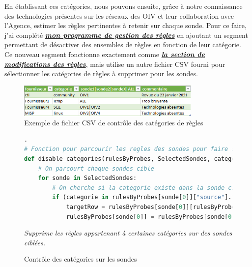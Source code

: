 En établissant ces catégories, nous pouvons ensuite, grâce à notre connaissance des technologies présentes sur les réseaux des OIV et leur collaboration avec l'Agence, estimer les règles pertinentes à retenir sur chaque sonde. Pour ce faire, j'ai complété \hyperref[chap3:section1]{\textbf{\textit{mon programme de gestion des règles}}} en ajoutant un segment permettant de désactiver des ensembles de règles en fonction de leur catégorie.\\

Ce nouveau segment fonctionne exactement comme \hyperref[chap3:section1rulesmodif]{\textbf{\textit{la section de modifications des règles}}}, mais utilise un autre fichier CSV fourni pour sélectionner les catégories de règles à supprimer pour les sondes.\\

\vspace{1em}

\begin{figure}[h]%
    \center%
    \includegraphics[width=0.8\textwidth]{assets/CategoriDisable.png}
    \caption[Exemple de fichier CSV de contrôle des catégories de règles]{Exemple de fichier CSV de contrôle des catégories de règles}\label{fig:CategoriDisable}
\end{figure}

\vspace{0.5em}

\begin{figure}[h]%
    \center%
\begin{lstlisting}[language=Python].
# Fonction pour parcourir les regles des sondes pour faire si possible la modification
def disable_categories(rulesByProbes, SelectedSondes, categorie, toDisable, modification_error):
    # On parcourt chaque sondes cible
    for sonde in SelectedSondes:
        # On cherche si la categorie existe dans la sonde cible
        if (categorie in rulesByProbes[sonde[0]]["source"].tolist()):
            targetRow = rulesByProbes[sonde[0]][rulesByProbes[sonde[0]]["source"].str.contains(categorie)]
            rulesByProbes[sonde[0]] = rulesByProbes[sonde[0]].drop(targetRow.index)
\end{lstlisting}
{\small
    \textit{Supprime les règles appartenant à certaines catégories sur des sondes ciblées.}
}
\caption[Contrôle des catégories sur les sondes]{Contrôle des catégories sur les sondes}\label{fig:RemoveCategorie}
\end{figure}

